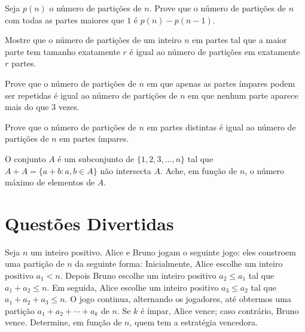 \documentclass[10pt, a4paper]{article}
\begin{document}
	\begin{prob}
		Seja $p(n)$ o número de partições de $n$. Prove que o número de partições de $n$ com todas as partes maiores que $1$ é $p(n) - p(n-1)$.
	\end{prob}
	
	\begin{prob}
		Mostre que o número de partições de um inteiro $n$ em partes tal que a maior parte tem tamanho exatamente $r$ é igual ao número de partições em exatamente $r$ partes.
	\end{prob}

	\begin{prob}
		Prove que o número de partições de $n$ em que apenas as partes ímpares podem ser repetidas é igual ao número de partições de $n$ em que nenhum parte aparece mais do que $3$ vezes.
	\end{prob}

	\begin{prob}
		Prove que o número de partições de $n$ em partes distintas é igual ao número de partições de $n$ em partes ímpares.
	\end{prob}

	\begin{prob}
		O conjunto $A$ é um subconjunto de $\{1, 2, 3, \dots, n\}$ tal que $A+A = \{a+b : a, b \in A\}$ não intersecta $A$. Ache, em função de $n$, o número máximo de elementos de $A$.
	\end{prob}

	\section{Questões Divertidas}

	\begin{prob}
		Seja $n$ um inteiro positivo.
		Alice e Bruno jogam o seguinte jogo: eles constroem uma partição de $n$ da seguinte forma: Inicialmente, Alice escolhe um inteiro positivo $a_1 < n$.
		Depois Bruno escolhe um inteiro positivo $a_2 \le a_1$ tal que $a_1 + a_2 \le n$.
		Em seguida, Alice escolhe um inteiro positivo $a_3 \le a_2$ tal que $a_1 + a_2 + a_3 \le n$.
		O jogo continua, alternando os jogadores, até obtermos uma partição $a_1 + a_2 + \cdots + a_k$ de $n$.
		Se $k$ é ímpar, Alice vence; caso contrário, Bruno vence.
		Determine, em função de $n$, quem tem a estratégia vencedora.
	\end{prob}

	
\end{document}

